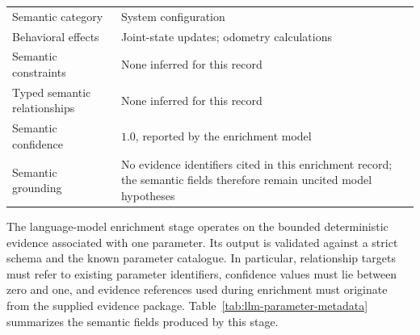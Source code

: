 \begin{table}[htbp]
\begin{tabular}{p{} p{}}
Semantic category & System configuration \\
Behavioral effects & Joint-state updates; odometry calculations \\
Semantic constraints & None inferred for this record \\
Typed semantic relationships & None inferred for this record \\
Semantic confidence & \(1.0\), reported by the enrichment model \\
Semantic grounding & No evidence identifiers cited in this enrichment record; the semantic fields therefore remain uncited model hypotheses \\
\hline
\end{tabular}
\end{table}

The language-model enrichment stage operates on the bounded deterministic evidence associated with one parameter. Its output is validated against a strict schema and the known parameter catalogue. In particular, relationship targets must refer to existing parameter identifiers, confidence values must lie between zero and one, and evidence references used during enrichment must originate from the supplied evidence package. Table~\ref{tab:llm-parameter-metadata} summarizes the semantic fields produced by this stage.

